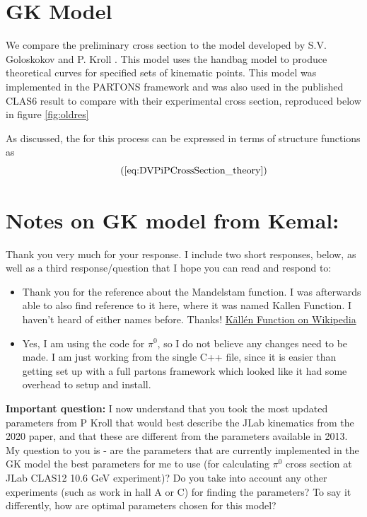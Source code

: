 \section{GK Model}

We compare the preliminary cross section to the model developed by S.V. Goloskokov and P. Kroll \cite{Goloskokov2010AnElectroproduction}. This model uses the handbag model to produce theoretical curves for specified sets of kinematic points. This model was implemented in the PARTONS framework \cite{Berthou2018PARTONS:Software} and was also used in the published CLAS6 result to compare with their experimental cross section, reproduced below in figure \ref{fig:oldres} \cite{Bedlinskiy2014ExclusiveCLAS}

As discussed, the \xsec for this process can be expressed in terms of structure functions as 
    \begin{equation*}
         \recallLabel{eq:DVPiPCrossSection_theory}
    \end{equation*}

\section*{Notes on GK model from Kemal:}

Thank you very much for your response. I include two short responses, below, as well as a third response/question that I hope you can read and respond to: 

\begin{itemize}
    \item Thank you for the reference about the Mandelstam function. I was afterwards able to also find reference to it here, where it was named Kallen Function. I haven't heard of either names before. Thanks! \href{https://en.wikipedia.org/wiki/K%C3%A4ll%C3%A9n_function}{Källén Function on Wikipedia}

    \item Yes, I am using the code for $\pi^0$, so I do not believe any changes need to be made. I am just working from the single C++ file, since it is easier than getting set up with a full partons framework which looked like it had some overhead to setup and install.
\end{itemize}

\textbf{Important question:} I now understand that you took the most updated parameters from P Kroll that would best describe the JLab kinematics from the 2020 paper, and that these are different from the parameters available in 2013. My question to you is - are the parameters that are currently implemented in the GK model the best parameters for me to use (for calculating $\pi^0$ cross section at JLab CLAS12 10.6 GeV experiment)? Do you take into account any other experiments (such as work in hall A or C) for finding the parameters? To say it differently, how are optimal parameters chosen for this model?

